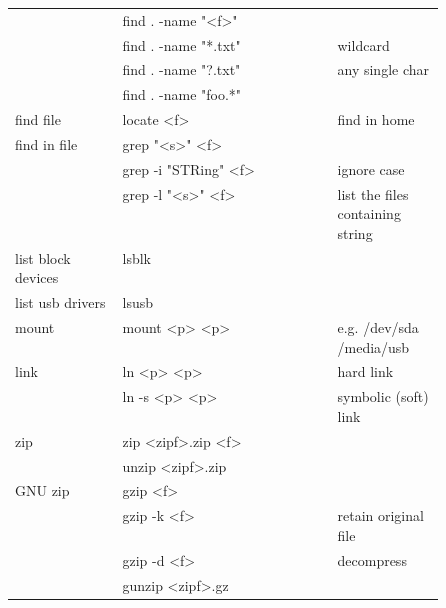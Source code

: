 {\begin{tabularx}{\linewidth}{@{} p{0.25\linewidth}>{\ttfamily}lp{0.25\linewidth} @{}}
                             & find . -name "<f>"         &                                  \\
                             & find . -name "*.txt"       & wildcard                         \\
                             & find . -name "?.txt"       & any single char                  \\
                             & find . -name "foo.*"       &                                  \\
        find file            & locate <f>                 & find in home                     \\
        find in file         & grep "<s>" <f>             &                                  \\
                             & grep -i "STRing" <f>       & ignore case                      \\
                             & grep -l "<s>" <f>          & list the files containing string \\
        list block devices   & lsblk                      &                                  \\
        list usb drivers     & lsusb                      &                                  \\
        mount                & mount <p> <p>              & e.g. /dev/sda /media/usb         \\
        link                 & ln <p> <p>                 & hard link                        \\
                             & ln -s <p> <p>              & symbolic (soft) link             \\
        zip                  & zip <zipf>.zip <f>         &                                  \\
                             & unzip <zipf>.zip           &                                  \\
        GNU zip              & gzip <f>                   &                                  \\
                             & gzip -k <f>                & retain original file             \\
                             & gzip -d <f>                & decompress                       \\
                             & gunzip <zipf>.gz           &                                  \\
    \end{tabularx}
}
